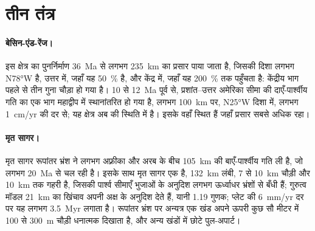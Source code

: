 \begin{omfigure}
\par{}\label{fig:b3:extension-strike-slip:strike-slip}
\end{omfigure}

\section{तीन तंत्र}\label{sec:b3:extension-strike-slip:systems}

\paragraph{बेसिन-एंड-रेंज।} इस क्षेत्र का पुनर्निर्माण
\qty{36}{Ma} से लगभग \qty{235}{km} का प्रसार पाया जाता है, जिसकी दिशा
लगभग N\ang{78}W है, उत्तर में, जहाँ यह \qty{50}{\percent} है, और
केंद्र में, जहाँ यह \qty{200}{\percent} तक पहुँचता है: केंद्रीय भाग पहले से तीन गुना चौड़ा हो गया है।
10 से \qty{12}{Ma} पूर्व से, प्रशांत–उत्तर अमेरिका सीमा की दाएँ-पार्श्वीय गति का
एक भाग महाद्वीप में स्थानांतरित हो गया है, लगभग \qty{100}{km} पर, N\ang{25}W दिशा में,
लगभग \qty{1}{cm/yr} की दर से; यह क्षेत्र अब  की स्थिति में है।
इसके  वहाँ स्थित हैं जहाँ प्रसार सबसे अधिक रहा।

\paragraph{मृत सागर।} मृत सागर रूपांतर भ्रंश ने लगभग
अफ़्रीका और अरब के बीच \qty{105}{km} की बाएँ-पार्श्वीय गति ली है, जो लगभग
\qty{20}{Ma} से चल रही है। इसके साथ मृत सागर एक  है, \qty{132}{km}
लंबी, 7 से \qty{10}{km} चौड़ी और \qty{10}{km} तक गहरी है, जिसकी पार्श्व सीमाएँ
भुजाओं के अनुदिश लगभग ऊर्ध्वाधर भ्रंशों से बँधी हैं; गुरुत्व मॉडल \qty{21}{km} का खिंचाव
अपनी अक्ष के अनुदिश देते हैं, यानी 1.19 गुणक; प्लेट की \qty{6}{mm/yr} दर पर यह
लगभग \qty{3.5}{Myr} लगाता है। रूपांतर भ्रंश पर अन्यत्र एक खंड
अपने ऊपरी कुछ सौ मीटर में 100 से \qty{300}{m} चौड़ी धनात्मक  दिखाता है,
और अन्य खंडों में छोटे पुल-अपार्ट।

